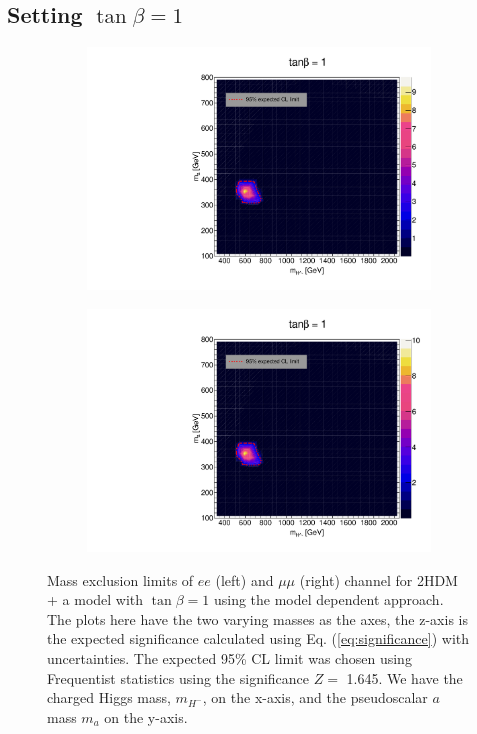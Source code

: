 \documentclass[12pt, a4paper]{book}
\begin{document}
\subsection{Setting $\tan\beta=1$}
\begin{figure}[!ht]
	\centering
   \begin{subfigure}[b]{0.49\textwidth}
      \centering
      \includegraphics[width=1\textwidth]{Limits/2HDM/2HDM_ee_tb1.pdf}
      \end{subfigure}
   \hfill
   \begin{subfigure}[b]{0.49\textwidth}
      \centering
      \includegraphics[width=1\textwidth]{Limits/2HDM/2HDM_uu_tb1.pdf}
      \end{subfigure}
   \caption[Expected mass exclusion limits of $ee$ and $\mu\mu$ channel for all 2HDM + a model with $\tan\beta=1$ model using the model dependent approach]{Mass exclusion limits of $ee$ (left) and $\mu\mu$ (right) channel for 2HDM + a model with $\tan\beta=1$ using the model dependent approach. 
   The plots here have the two varying masses as the axes, the z-axis is the expected significance calculated using Eq. (\ref{eq:significance}) with uncertainties. The expected 95\% CL limit was chosen using Frequentist statistics using the significance $Z=$ 1.645.   
   We have the charged Higgs mass, $m_{H^-}$, on the x-axis, and the pseudoscalar $a$ mass $m_{a}$ on the y-axis.}
\end{figure}
\end{document}
